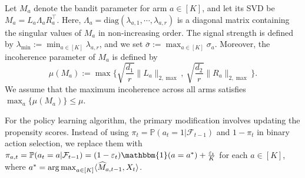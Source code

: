 \documentclass[12pt]{article}
\newcommand{\inp}[2]{\langle #1,#2\rangle}
\newcommand{\argmax}{\mathop{\rm arg\max}}
\newcommand{\PP}{\mathbb{P}}
\def\PP{{\mathbb P}}
\def\hat{\widehat}
\theoremstyle{plain}
\begin{document}
Let $M_a$ denote the bandit parameter for arm $a\in[K]$, and let its SVD be $M_a=L_a\Lambda_aR_a^{\top}$. Here, $\Lambda_a = \text{diag}(\lambda_{a,1},\cdots,\lambda_{a,r})$ is a diagonal matrix containing the singular values of $M_a$ in non-increasing order. The signal strength is defined by $\lambda_{\min} := \min_{a\in [K]}\lambda_{a,r}$, and we set $\bar\sigma:=\max_{a\in [K]} \sigma_a$. Moreover, the incoherence parameter of $M_a$ is defined by
$$
\mu(M_a):=\max\bigg\{\sqrt{\frac{d_1}{r}}\|L_a\|_{2,\max},\ \sqrt{\frac{d_2}{r}}\|R_a\|_{2,\max} \bigg\}.
$$
We assume that the maximum incoherence across all arms satisfies  $\max_a\{\mu(M_a)\}\leq \mu$. 

For the policy learning algorithm, the primary modification involves updating the propensity scores. Instead of using $\pi_t=\PP(a_t=1|\mathcal{F}_{t-1})$ and $1-\pi_t$ in binary action selection, we replace them with $\pi_{a,t}=\PP(a_t=a|\mathcal{F}_{t-1})=(1-\varepsilon_t)\mathbbm{1}(a=a^{*})+\frac{\varepsilon_t}{K}$ for each $a\in [K]$, where $a^{*}=\argmax_{a\in [K]} \inp{\hat M_{a,t-1}}{X_t}$.
\end{document}
